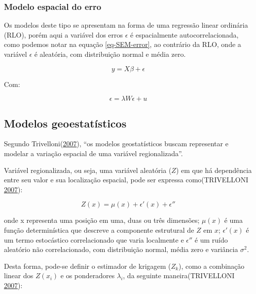 \documentclass[12pt,]{article}
\begin{document}
\subsubsection{Modelo espacial do erro}\label{modelo-espacial-do-erro}

Os modelos deste tipo se apresentam na forma de uma regressão linear
ordinária (RLO), porém aqui a variável dos erros \(\epsilon\) é
espacialmente autocorrelacionada, como podemos notar na equação
\ref{eq-SEM-error}, ao contrário da RLO, onde a variável \(\epsilon\) é
aleatória, com distribuição normal e média zero.

\begin{equation}
  \label{eq-SEM}
  y = X\beta + \epsilon
\end{equation}

Com:

\begin{equation}
  \label{eq-SEM-error}
  \epsilon = \lambda W \epsilon + u
\end{equation}

\subsection{Modelos geoestatísticos}\label{modelos-geoestatisticos}

Segundo Trivelloni(\protect\hyperlink{ref-trivelloni07}{2007}), ``os
modelos geostatísticos buscam representar e modelar a variação espacial
de uma variável regionalizada''.

Variável regionalizada, ou seja, uma variável aleatória (\(Z\)) em que
há dependência entre seu valor e sua localização espacial, pode ser
expressa como(TRIVELLONI \protect\hyperlink{ref-trivelloni07}{2007}):

\begin{equation}
  \label{eq-regional}
  Z(x) = \mu(x) + \epsilon'(x) + \epsilon''
\end{equation}

onde x representa uma posição em uma, duas ou três dimensões; \(\mu(x)\)
é uma função determinística que descreve a componente estrutural de
\(Z\) em \(x\); \(\epsilon'(x)\) é um termo estocástico correlacionado
que varia localmente e \(\epsilon''\) é um ruído aleatório não
correlacionado, com distribuição normal, média zero e variância
\(\sigma^2\).

Desta forma, pode-se definir o estimador de krigagem (\(Z_k\)), como a
combinação linear dos \(Z(x_i)\) e os ponderadores \(\lambda_i\), da
seguinte maneira(TRIVELLONI \protect\hyperlink{ref-trivelloni07}{2007}):
\end{document}
